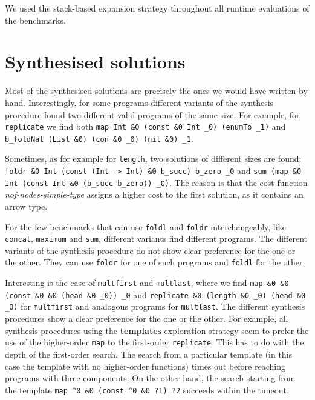 We used the stack-based expansion strategy throughout all runtime evaluations of the benchmarks.

\section{Synthesised solutions}
Most of the synthesised solutions are precisely the ones we would have written by hand. Interestingly, for some programs different variants of the synthesis procedure found two different valid programs of the same size. For example, for \lstinline?replicate? we find both \lstinline?map Int &0 (const &0 Int _0) (enumTo _1)? and \lstinline?b_foldNat (List &0) (con &0 _0) (nil &0) _1?.

Sometimes, as for example for \lstinline?length?, two solutions of different sizes are found: \lstinline?foldr &0 Int (const (Int -> Int) &0 b_succ) b_zero _0? and \lstinline?sum (map &0 Int (const Int &0 (b_succ b_zero)) _0)?. The reason is that the cost function \textit{nof-nodes-simple-type} assigns a higher cost to the first solution, as it contains an arrow type.

For the few benchmarks that can use \lstinline?foldl? and \lstinline?foldr? interchangeably, like \lstinline?concat?, \lstinline?maximum? and \lstinline?sum?, different variants find different programs. The different variants of the synthesis procedure do not show clear preference for the one or the other. They can use \lstinline?foldr? for one of such programs and \lstinline?foldl? for the other.

Interesting is the case of \lstinline?multfirst? and \lstinline?multlast?, where we find \lstinline?map &0 &0 (const &0 &0 (head &0 _0)) _0? and \lstinline?replicate &0 (length &0 _0) (head &0 _0)? for \lstinline?multfirst? and analogous programs for \lstinline?multlast?. The different synthesis procedures show a clear preference for the one or the other. For example, all synthesis procedures using the \textbf{templates} exploration strategy seem to prefer the use of the higher-order \lstinline?map? to the first-order \lstinline?replicate?. This has to do with the depth of the first-order search. The search from a particular template (in this case the template with no higher-order functions) times out before reaching programs with three components. On the other hand, the search starting from the template \lstinline!map ^0 &0 (const ^0 &0 ?1) ?2! succeeds within the timeout.

